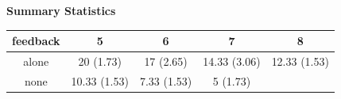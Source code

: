 \documentclass[]{article}
\begin{document}
\clearpage

\textbf{Summary Statistics}

\begin{longtable}[]{@{}ccccc@{}}
\toprule
\begin{minipage}[b]{0.13\columnwidth}\centering\strut
feedback\strut
\end{minipage} & \begin{minipage}[b]{0.18\columnwidth}\centering\strut
5\strut
\end{minipage} & \begin{minipage}[b]{0.17\columnwidth}\centering\strut
6\strut
\end{minipage} & \begin{minipage}[b]{0.18\columnwidth}\centering\strut
7\strut
\end{minipage} & \begin{minipage}[b]{0.18\columnwidth}\centering\strut
8\strut
\end{minipage}\tabularnewline
\midrule
\endhead
\begin{minipage}[t]{0.13\columnwidth}\centering\strut
alone\strut
\end{minipage} & \begin{minipage}[t]{0.18\columnwidth}\centering\strut
20 (1.73)\strut
\end{minipage} & \begin{minipage}[t]{0.17\columnwidth}\centering\strut
17 (2.65)\strut
\end{minipage} & \begin{minipage}[t]{0.18\columnwidth}\centering\strut
14.33 (3.06)\strut
\end{minipage} & \begin{minipage}[t]{0.18\columnwidth}\centering\strut
12.33 (1.53)\strut
\end{minipage}\tabularnewline
\begin{minipage}[t]{0.13\columnwidth}\centering\strut
none\strut
\end{minipage} & \begin{minipage}[t]{0.18\columnwidth}\centering\strut
10.33 (1.53)\strut
\end{minipage} & \begin{minipage}[t]{0.17\columnwidth}\centering\strut
7.33 (1.53)\strut
\end{minipage} & \begin{minipage}[t]{0.18\columnwidth}\centering\strut
5 (1.73)\strut
\end{minipage} & \begin{minipage}[t]{0.18\columnwidth}\centering\strut

\end{minipage}
\end{longtable}
\end{document}
